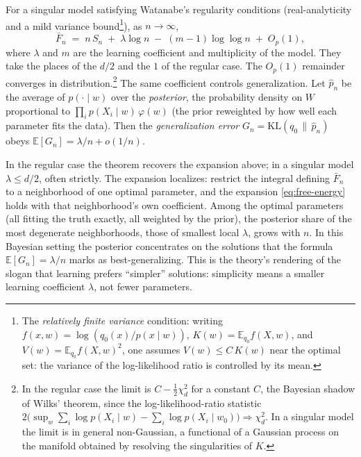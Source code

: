 \begin{theorem*}
For a singular model satisfying Watanabe's regularity conditions (real-analyticity and a mild variance bound\footnote{The \emph{relatively finite variance} condition: writing $f(x,w)=\log(q_0(x)/p(x\mid w))$, $K(w)=\mathbb{E}_{q_0} f(X,w)$, and $V(w)=\mathbb{E}_{q_0} f(X,w)^2$, one assumes $V(w)\le C\,K(w)$ near the optimal set: the variance of the log-likelihood ratio is controlled by its mean.}), as $n\to\infty$,
\begin{equation}\label{eq:free-energy}
   \bar F_n \;=\; n\,S_n \;+\; \lambda\log n \;-\; (m-1)\log\log n \;+\; O_p(1),
\end{equation}
where $\lambda$ and $m$ are the learning coefficient and multiplicity of the model. They take the places of the $d/2$ and the $1$ of the regular case. The $O_p(1)$ remainder converges in distribution.\footnote{In the regular case the limit is $C-\tfrac12\chi^2_d$ for a constant $C$, the Bayesian shadow of Wilks' theorem, since the log-likelihood-ratio statistic $2\bigl(\sup_w\textstyle\sum_i\log p(X_i\mid w)-\sum_i\log p(X_i\mid w_0)\bigr)\Rightarrow\chi^2_d$. In a singular model the limit is in general non-Gaussian, a functional of a Gaussian process on the manifold obtained by resolving the singularities of $K$.} The same coefficient controls generalization. Let $\hat p_n$ be the average of $p(\cdot\mid w)$ over the \emph{posterior}, the probability density on $W$ proportional to $\prod_i p(X_i\mid w)\,\varphi(w)$ (the prior reweighted by how well each parameter fits the data). Then the \emph{generalization error} $G_n=\mathrm{KL}(q_0\,\|\,\hat p_n)$ obeys $\mathbb{E}[G_n]=\lambda/n+o(1/n)$.
\end{theorem*}

In the regular case the theorem recovers the expansion above; in a singular model $\lambda\le d/2$, often strictly. The expansion localizes: restrict the integral defining $\bar F_n$ to a neighborhood of one optimal parameter, and the expansion \eqref{eq:free-energy} holds with that neighborhood's own coefficient. Among the optimal parameters (all fitting the truth exactly, all weighted by the prior), the posterior share of the most degenerate neighborhoods, those of smallest local $\lambda$, grows with $n$. In this Bayesian setting the posterior concentrates on the solutions that the formula $\mathbb{E}[G_n]=\lambda/n$ marks as best-generalizing. This is the theory's rendering of the slogan that learning prefers ``simpler'' solutions: simplicity means a smaller learning coefficient $\lambda$, not fewer parameters.

